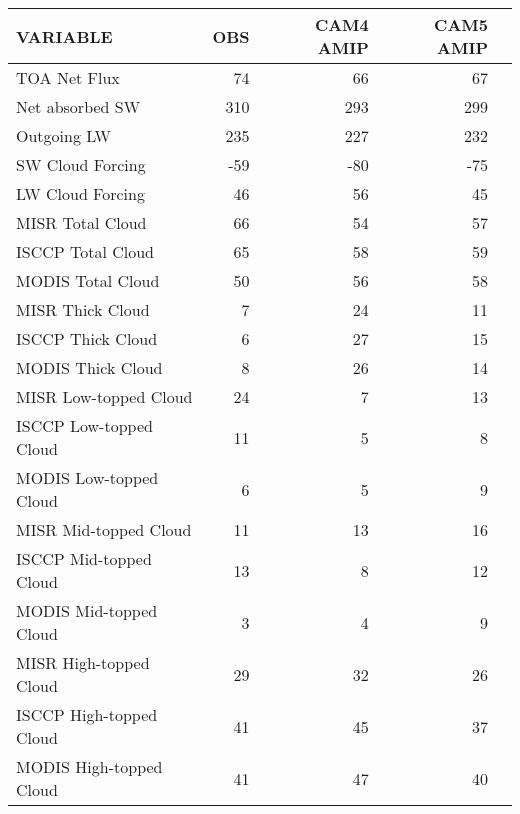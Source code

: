 \begin{tabular}{lrrrr}
\hline
                VARIABLE &                      OBS &                CAM4 AMIP &                CAM5 AMIP \\ \hline
            TOA Net Flux &                       74 &                       66 &                       67 \\
         Net absorbed SW &                      310 &                      293 &                      299 \\
             Outgoing LW &                      235 &                      227 &                      232 \\
        SW Cloud Forcing &                      -59 &                      -80 &                      -75 \\
        LW Cloud Forcing &                       46 &                       56 &                       45 \\
        MISR Total Cloud &                       66 &                       54 &                       57 \\
       ISCCP Total Cloud &                       65 &                       58 &                       59 \\
       MODIS Total Cloud &                       50 &                       56 &                       58 \\
        MISR Thick Cloud &                        7 &                       24 &                       11 \\
       ISCCP Thick Cloud &                        6 &                       27 &                       15 \\
       MODIS Thick Cloud &                        8 &                       26 &                       14 \\
   MISR Low-topped Cloud &                       24 &                        7 &                       13 \\
  ISCCP Low-topped Cloud &                       11 &                        5 &                        8 \\
  MODIS Low-topped Cloud &                        6 &                        5 &                        9 \\
   MISR Mid-topped Cloud &                       11 &                       13 &                       16 \\
  ISCCP Mid-topped Cloud &                       13 &                        8 &                       12 \\
  MODIS Mid-topped Cloud &                        3 &                        4 &                        9 \\
  MISR High-topped Cloud &                       29 &                       32 &                       26 \\
 ISCCP High-topped Cloud &                       41 &                       45 &                       37 \\
 MODIS High-topped Cloud &                       41 &                       47 &                       40 \\ \hline
\end{tabular}
